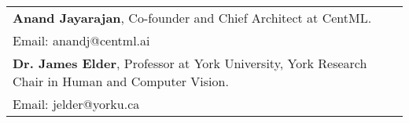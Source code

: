 \begin{tabularx}{\textwidth}{ @{}l r@{} }
    \textbf{Anand Jayarajan}, Co-founder and Chief Architect at CentML. \\
    Email: anandj@centml.ai \\[10pt]
    \textbf{Dr. James Elder}, Professor at York University,   York Research Chair in Human and Computer Vision. \\
    Email: jelder@yorku.ca 
\end{tabularx}